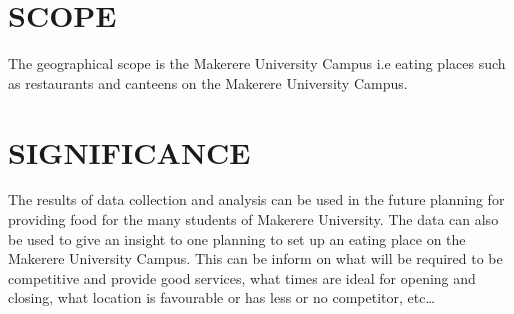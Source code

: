 \documentclass[]{article}
\begin{document}
\section*{SCOPE}
The geographical scope is the Makerere University Campus i.e eating places such as restaurants and canteens on the Makerere University Campus.
\section*{SIGNIFICANCE}
The results of data collection and analysis can be used in the future planning for providing food for the many students of Makerere University.
The data can also be used to give an insight to one planning to set up an eating place on the Makerere University Campus. This can be inform on what will be required to be competitive and provide good services, what times are ideal for opening and closing, what location is favourable or has less or no competitor, etc…
\end{document}
